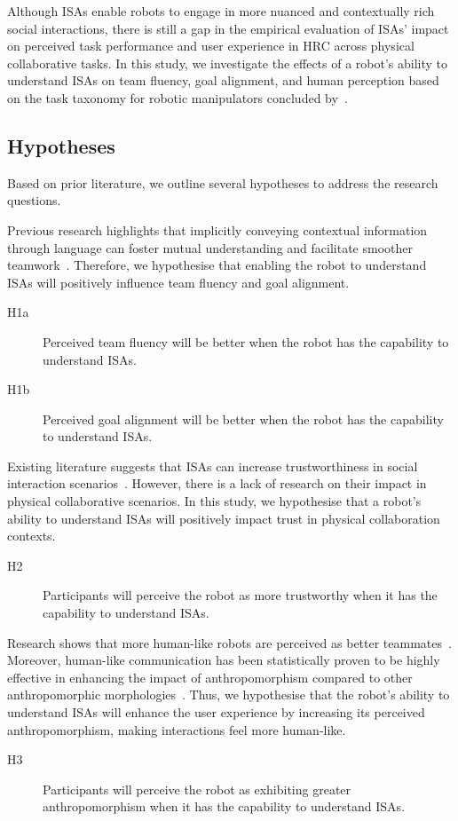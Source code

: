 Although ISAs enable robots to engage in more nuanced and contextually rich social interactions, there is still a gap in the empirical evaluation of ISAs' impact on perceived task performance and user experience in HRC across physical collaborative tasks. In this study, we investigate the effects of a robot's ability to understand ISAs on team fluency, goal alignment, and human perception based on the task taxonomy for robotic manipulators concluded by~\cite{semeraro2023human}.

\subsection{Hypotheses}
Based on prior literature, we outline several hypotheses to address the research questions.

Previous research highlights that implicitly conveying contextual information through language can foster mutual understanding and facilitate smoother teamwork~\cite{frank2012predicting, clark1996using}. Therefore, we hypothesise that enabling the robot to understand ISAs will positively influence team fluency and goal alignment.
\begin{description}
    \item [H1a] Perceived team fluency will be better when the robot has the capability to understand ISAs. 
    \item [H1b] Perceived goal alignment will be better when the robot has the capability to understand ISAs.
\end{description}

Existing literature suggests that ISAs can increase trustworthiness in social interaction scenarios~\cite{saunderson2021robots}. However, there is a lack of research on their impact in physical collaborative scenarios. In this study, we hypothesise that a robot's ability to understand ISAs will positively impact trust in physical collaboration contexts.
\begin{description}
    \item [H2] Participants will perceive the robot as more trustworthy when it has the capability to understand ISAs.
\end{description}

Research shows that more human-like robots are perceived as better teammates~\cite{zhang2021ideal}. Moreover, human-like communication has been statistically proven to be highly effective in enhancing the impact of anthropomorphism compared to other anthropomorphic morphologies~\cite{roesler2021meta}. Thus, we hypothesise that the robot's ability to understand ISAs will enhance the user experience by increasing its perceived anthropomorphism, making interactions feel more human-like. 
\begin{description}
    \item [H3] Participants will perceive the robot as exhibiting greater anthropomorphism when it has the capability to understand ISAs.
\end{description}
